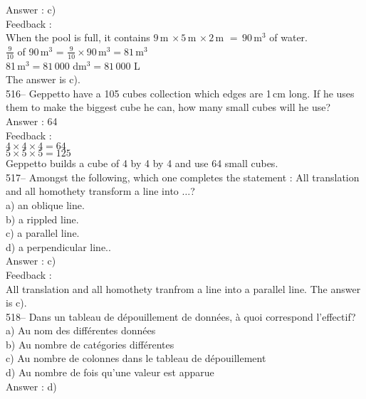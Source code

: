 \documentclass[letterpaper, 12pt]{article}
\begin{document}
Answer : c)\\

Feedback :\\
When the pool is full, it contains  $9$\,m
$\times\,5$\,m $\times\,2$\,m $=\,90$\,m$^{3}$ of water.\\[2mm]
$\frac{9}{10}$ of 90\,m$^{3}$ =
$\frac{9}{10}\times90$\,m$^{3}=81$\,m$^{3}$\\[2mm]
81\,m$^{3}=81\,000$ dm$^{3}=81\,000$ L\\[2mm]
The answer is c).\\

516-- Geppetto have a 105 cubes collection which edges are 1\,cm long. If he uses them to make the biggest cube he can, how many small cubes will he use? \\

Answer : 64\\

Feedback :  \\
$4\times4\times4=64$\\
$5\times5\times5=125$\\
Geppetto builds a cube of 4 by 4 by 4 and use 64 small cubes.  \\

517-- Amongst the following, which one completes the statement : \og All translation and all homothety transform a line into $\ldots$\fg ?\\
a) an oblique line.\\
b) a rippled line.\\
c) a parallel line.\\
d) a perpendicular line..\\

Answer : c)\\

Feedback : \\
All translation and all homothety tranfrom a line into a parallel line.  The answer is c).\\


518-- Dans un tableau de d\'epouillement de donn\'ees, \`a quoi correspond
l'effectif?\\
a) Au nom des diff\'erentes donn\'ees\\
b) Au nombre de cat\'egories diff\'erentes\\
c) Au nombre de colonnes dans le tableau de d\'epouillement\\
d) Au nombre de fois qu'une valeur est apparue\\

Answer : d)\\
\end{document}
